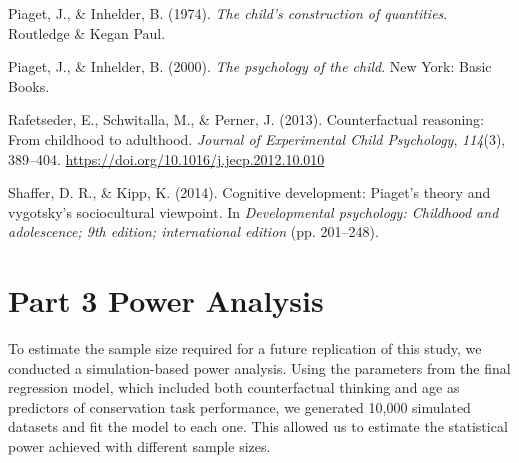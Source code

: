 \documentclass[
  doc]{apa6}
\newlength{\cslhangindent}
\newenvironment{CSLReferences}[2] %
 {\begin{list}{}{%
  \setlength{\itemindent}{0pt}
  \setlength{\leftmargin}{0pt}
  \setlength{\parsep}{0pt}
  \ifodd #1
   \setlength{\leftmargin}{\cslhangindent}
   \setlength{\itemindent}{-1\cslhangindent}
  \fi
  \setlength{\itemsep}{#2\baselineskip}}}
 {\end{list}}
\begin{document}
\begin{CSLReferences}{1}{0}
Piaget, J., \& Inhelder, B. (1974). \emph{The child's construction of quantities}. Routledge \& Kegan Paul.

Piaget, J., \& Inhelder, B. (2000). \emph{The psychology of the child}. New York: Basic Books.

Rafetseder, E., Schwitalla, M., \& Perner, J. (2013). Counterfactual reasoning: From childhood to adulthood. \emph{Journal of Experimental Child Psychology}, \emph{114}(3), 389--404. \url{https://doi.org/10.1016/j.jecp.2012.10.010}

Shaffer, D. R., \& Kipp, K. (2014). Cognitive development: Piaget's theory and vygotsky's sociocultural viewpoint. In \emph{Developmental psychology: Childhood and adolescence; 9th edition; international edition} (pp. 201--248).

\end{CSLReferences}

\newpage

\section{Part 3 Power Analysis}\label{part-3-power-analysis}

To estimate the sample size required for a future replication of this study, we conducted a simulation-based power analysis. Using the parameters from the final regression model, which included both counterfactual thinking and age as predictors of conservation task performance, we generated 10,000 simulated datasets and fit the model to each one. This allowed us to estimate the statistical power achieved with different sample sizes.
\end{document}
